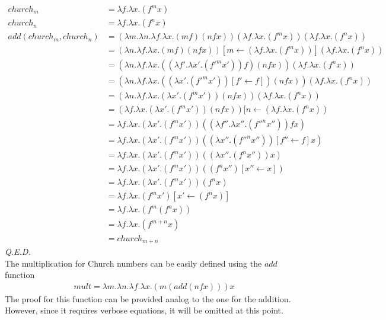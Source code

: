 \begin{align}
							church_m &= \lambda f. \lambda x. (f^{m} x) \\
							church_n &= \lambda f. \lambda x. (f^{n} x) \\
add(church_m,church_n) &= (\lambda m. \lambda n. \lambda f. \lambda x. (m f) (n f x)) (\lambda f. \lambda x. (f^{m} x)) (\lambda f. \lambda x. (f^{n} x)) \\
											 &= (\lambda n. \lambda f. \lambda x. (m f) (n f x)) [m \leftarrow (\lambda f. \lambda x. (f^{m} x))] (\lambda f. \lambda x. (f^{n} x)) \\
											 &= (\lambda n. \lambda f. \lambda x. ((\lambda f'. \lambda x'. (f'^{m} x')) f) (n f x)) (\lambda f. \lambda x. (f^{n} x)) \\
											 &= (\lambda n. \lambda f. \lambda x. ((\lambda x'. (f'^{m} x')) [f' \leftarrow f]) (n f x)) (\lambda f. \lambda x. (f^{n} x)) \\
											 &= (\lambda n. \lambda f. \lambda x. (\lambda x'. (f^{m} x')) (n f x)) (\lambda f. \lambda x. (f^{n} x)) \\
											 &= (\lambda f. \lambda x. (\lambda x'. (f^{m} x')) (n f x)) [n \leftarrow (\lambda f. \lambda x. (f^{n} x)) \\
											 &= \lambda f. \lambda x. (\lambda x'. (f^{m} x')) ((\lambda f''. \lambda x''. (f''^{n} x'')) f x) \\
											 &= \lambda f. \lambda x. (\lambda x'. (f^{m} x')) ((\lambda x''. (f''^{n} x'')) [f'' \leftarrow f] x) \\
											 &= \lambda f. \lambda x. (\lambda x'. (f^{m} x')) ((\lambda x''. (f^{n} x'')) x) \\
											 &= \lambda f. \lambda x. (\lambda x'. (f^{m} x')) ((f^{n} x'') [x'' \leftarrow x]) \\
											 &= \lambda f. \lambda x. (\lambda x'. (f^{m} x')) (f^{n} x) \\
											 &= \lambda f. \lambda x. (f^{m} x') [x' \leftarrow (f^{n} x)] \\
											 &= \lambda f. \lambda x. (f^{m}(f^{n} x)) \\
											 &= \lambda f. \lambda x. (f^{m+n} x) \\
											 &= church_{m+n}
\end{align}
\emph{Q.E.D.}
\\
The multiplication for Church numbers can be easily defined using the $add$ function
\begin{align}
	mult = \lambda m. \lambda n. \lambda f. \lambda x. (m (add (n f x))) x
\end{align}
The proof for this function can be provided analog to the one for the addition. However, since it requires verbose equations, it will be omitted at this point.